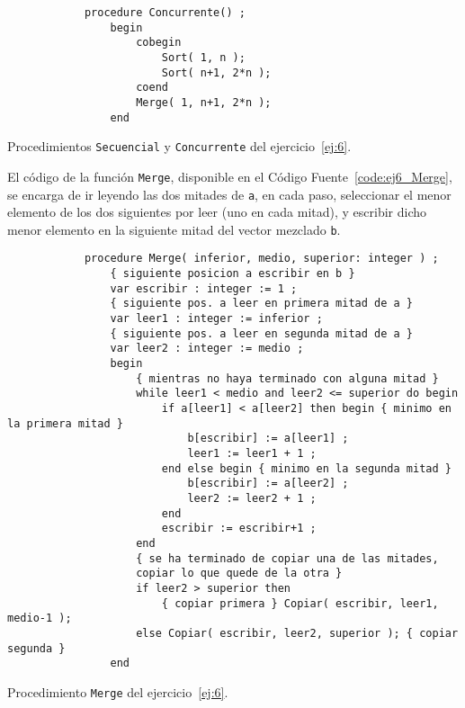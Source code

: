 \begin{ejercicio}
\begin{listing}
\begin{verbatim}
            procedure Concurrente() ;
                begin
                    cobegin
                        Sort( 1, n );
                        Sort( n+1, 2*n );
                    coend
                    Merge( 1, n+1, 2*n );
                end
        \end{verbatim}
        \caption{Procedimientos \texttt{Secuencial} y \texttt{Concurrente} del ejercicio~\ref{ej:6}.}
        \label{code:ej6_2versiones}
    \end{listing}

    El código de la función \verb|Merge|, disponible en el Código Fuente~\ref{code:ej6_Merge}, se encarga de ir leyendo las dos mitades de \verb|a|, en cada paso, seleccionar el menor elemento de los dos siguientes por leer (uno en cada mitad), y escribir dicho menor elemento en la siguiente mitad del vector mezclado \verb|b|.
    \begin{listing}
        \begin{verbatim}
            procedure Merge( inferior, medio, superior: integer ) ;
                { siguiente posicion a escribir en b }
                var escribir : integer := 1 ;
                { siguiente pos. a leer en primera mitad de a }
                var leer1 : integer := inferior ;
                { siguiente pos. a leer en segunda mitad de a }
                var leer2 : integer := medio ;
                begin
                    { mientras no haya terminado con alguna mitad }
                    while leer1 < medio and leer2 <= superior do begin
                        if a[leer1] < a[leer2] then begin { minimo en la primera mitad }
                            b[escribir] := a[leer1] ;
                            leer1 := leer1 + 1 ;
                        end else begin { minimo en la segunda mitad }
                            b[escribir] := a[leer2] ;
                            leer2 := leer2 + 1 ;
                        end
                        escribir := escribir+1 ;
                    end
                    { se ha terminado de copiar una de las mitades,
                    copiar lo que quede de la otra }
                    if leer2 > superior then
                        { copiar primera } Copiar( escribir, leer1, medio-1 );
                    else Copiar( escribir, leer2, superior ); { copiar segunda }
                end
        \end{verbatim}
        \caption{Procedimiento \texttt{Merge} del ejercicio~\ref{ej:6}.}
        \label{code:ej6_Merge}
    \end{listing}


\end{ejercicio}
